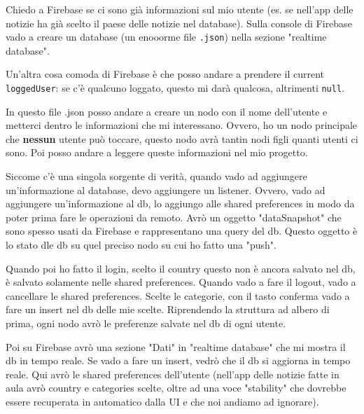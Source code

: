 \par Chiedo a Firebase se ci sono già informazioni sul mio utente (es. se nell'app delle notizie ha già scelto il paese delle notizie nel database). Sulla console di Firebase vado a creare un database (un enooorme file \texttt{.json}) nella sezione "realtime database".
\par Un'altra cosa comoda di Firebase è che posso andare a prendere il current \texttt{loggedUser}: se c'è qualcuno loggato, questo mi darà qualcosa, altrimenti \texttt{null}.
\par In questo file .json posso andare a creare un nodo con il nome dell'utente e metterci dentro le informazioni che mi interessano. Ovvero, ho un nodo principale che \textbf{nessun} utente può toccare, questo nodo avrà tantin nodi figli quanti utenti ci sono. Poi posso andare a leggere queste informazioni nel mio progetto. 
\par Siccome c'è una singola sorgente di verità, quando vado ad aggiungere un'informazione al database, devo aggiungere un listener. Ovvero, vado ad aggiungere un'informazione al db, lo aggiungo alle shared preferences in modo da poter prima fare le operazioni da remoto. Avrò un oggetto "dataSnapshot" che sono spesso usati da Firebase e rappresentano una query del db. Questo oggetto è lo stato dle db su quel preciso nodo su cui ho fatto una "push".
\par Quando poi ho fatto il login, scelto il country questo non è ancora salvato nel db, è salvato solamente nelle shared preferences. Quando vado a fare il logout, vado a cancellare le shared preferences. Scelte le categorie, con il tasto conferma vado a fare un insert nel db delle mie scelte. Riprendendo la struttura ad albero di prima, ogni nodo avrò le preferenze salvate nel db di ogni utente.
\par Poi su Firebase avrò una sezione "Dati" in "realtime database" che mi mostra il db in tempo reale. Se vado a fare un insert, vedrò che il db si aggiorna in tempo reale. Qui avrò le shared preferences dell'utente (nell'app delle notizie fatte in aula avrò country e categories scelte, oltre ad una voce "stability" che dovrebbe essere recuperata in automatico dalla UI e che noi andiamo ad ignorare).